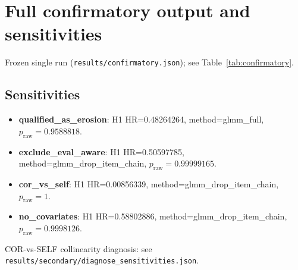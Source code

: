 \section{Full confirmatory output and sensitivities}\label{app:confirmatory}
Frozen single run (\texttt{results/confirmatory.json}); see Table~\ref{tab:confirmatory}.


\subsection{Sensitivities}
\begin{itemize}
\item \textbf{qualified\_as\_erosion}: H1 HR=0.48264264, method=glmm\_full, $p_{\mathrm{raw}}=0.9588818$.
\item \textbf{exclude\_eval\_aware}: H1 HR=0.50597785, method=glmm\_drop\_item\_chain, $p_{\mathrm{raw}}=0.99999165$.
\item \textbf{cor\_vs\_self}: H1 HR=0.00856339, method=glmm\_drop\_item\_chain, $p_{\mathrm{raw}}=1$.
\item \textbf{no\_covariates}: H1 HR=0.58802886, method=glmm\_drop\_item\_chain, $p_{\mathrm{raw}}=0.9998126$.
\end{itemize}
COR-vs-SELF collinearity diagnosis: see \texttt{results/secondary/diagnose\_sensitivities.json}.
